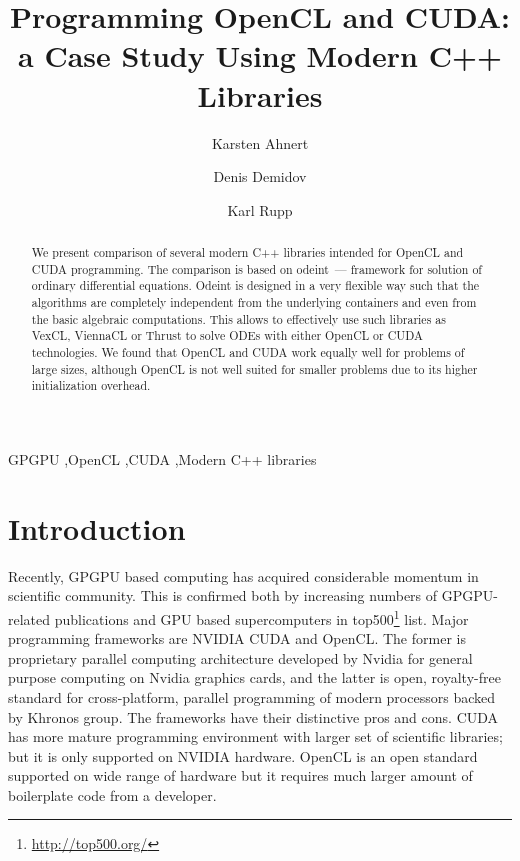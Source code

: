 \documentclass[1p]{elsarticle}
\begin{document}
\begin{frontmatter}

\title{Programming OpenCL and CUDA:\\a Case Study Using Modern C++ Libraries}

\author{Karsten Ahnert}
\address{
Institut f\"ur Physik und Astronomie, Universit\"at Potsdam,\\
Karl-Liebknecht-Strasse 24/25, 14476 Potsdam-Golm, Germany
}

\author{Denis Demidov}
\address{
Kazan Branch of Joint Supercomputer Center,
Russian Academy of Sciences,\\
Lobachevsky st. 2/31, 420008 Kazan, Russia
}

\author{Karl Rupp}
\address{
Institute for Microelectronics, TU Wien,\\
Gusshausstrasse 27-29/E360, A-1040 Wien, Austria
}

\begin{abstract}
    We present comparison of several modern C++ libraries intended for OpenCL
    and CUDA programming. The comparison is based on odeint~--- framework for
    solution of ordinary differential equations. Odeint is designed in a very
    flexible way such that the algorithms are completely independent from the
    underlying containers and even from the basic algebraic computations. This
    allows to effectively use such libraries as VexCL, ViennaCL or Thrust to
    solve ODEs with either OpenCL or CUDA technologies. We found that OpenCL
    and CUDA work equally well for problems of large sizes, although OpenCL is
    not well suited for smaller problems due to its higher initialization
    overhead.
\end{abstract}

\begin{keyword}
    GPGPU \sep OpenCL \sep CUDA \sep Modern C++ libraries
\end{keyword}

\end{frontmatter}

\section{Introduction}

Recently, GPGPU based computing has acquired considerable momentum in
scientific community. This is confirmed both by increasing numbers of
GPGPU-related publications and GPU based supercomputers in
top500\footnote{\href{http://top500.org/}{http://top500.org/}} list. Major
programming frameworks are NVIDIA CUDA and OpenCL.  The former is proprietary
parallel computing architecture developed by Nvidia for general purpose
computing on Nvidia graphics cards, and the latter is open, royalty-free
standard for cross-platform, parallel programming of modern processors backed
by Khronos group. The frameworks have their distinctive pros and cons. CUDA has
more mature programming environment with larger set of scientific libraries;
but it is only supported on NVIDIA hardware. OpenCL is an open standard
supported on wide range of hardware but it requires much larger amount of
boilerplate code from a developer.
\end{document}
